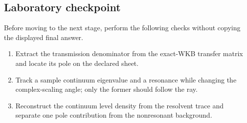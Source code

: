 \subsection*{Laboratory checkpoint}
Before moving to the next stage, perform the following checks without copying
the displayed final answer.
\begin{enumerate}
  \item Extract the transmission denominator from the exact-WKB transfer matrix and locate its pole on the declared sheet.
  \item Track a sample continuum eigenvalue and a resonance while changing the complex-scaling angle; only the former should follow the ray.
  \item Reconstruct the continuum level density from the resolvent trace and separate one pole contribution from the nonresonant background.
\end{enumerate}
